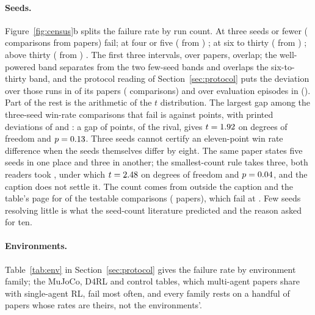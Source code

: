 \documentclass[sigconf,anonymous]{aamas}
\begin{document}
\paragraph{Seeds.} Figure~\ref{fig:census}b splits the failure rate by
run count. At three seeds or fewer (\nRunsLeThreeN{} comparisons from
\nRunsLeThreePapers{} papers) \nRunsLeThreeFailCi{} fail; at four or five
(\nRunsFourToFiveN{} from \nRunsFourToFivePapers{})
\nRunsFourToFiveFailCi{}; at six to thirty (\nRunsSixToThirtyN{} from
\nRunsSixToThirtyPapers{}) \nRunsSixToThirtyFailCi{}; above thirty
(\nRunsGtThirtyN{} from \nRunsGtThirtyPapers{}) \nRunsGtThirtyFailCi{}.
The first three intervals, over papers, overlap; the well-powered band
separates from the two few-seed bands and overlaps the six-to-thirty
band, and the protocol reading of
Section~\ref{sec:protocol} puts the deviation over those runs in
\nBignSdOverSeedsPapers{} of its \nBignPapers{} papers
(\nBignSdOverSeedsComparisons{} comparisons) and over evaluation episodes
in \nBignSdOverEpisodesPapers{} (\nBignSdOverEpisodesComparisons{}).
Part of the rest is the arithmetic of the $t$ distribution. The largest gap
among the \nExNThreeSeedFailing{} three-seed win-rate comparisons that fail
is \nExWinner{} against \nExRunner{} points, with printed deviations of
\nExWinnerSd{} and \nExRunnerSd{}: a gap of \nExGap{} points,
\nExRelativeGap{} of the rival, gives $t = 1.92{}$ on \nExDf{} degrees of
freedom and $p = 0.13{}$. Three seeds cannot certify an eleven-point win
rate difference when the seeds themselves differ by eight. The same paper
states five seeds in one place and three in another; the smallest-count
rule takes three, both readers took \nExReaderN{}, under which
$t = 2.48{}$ on \nExReaderDf{} degrees of freedom and
$p = 0.04{}$, and the caption does not settle it. The count comes
from outside the caption and the table's page for \nSpanRunsFromPaperN{}
of the \nANTestable{} testable comparisons (\nSpanRunsFromPaperPapers{}
papers), which fail at \nSpanRunsFromPaperFail{}. Few seeds resolving
little is what the seed-count literature predicted
\cite{colas2018how,agarwal2021deep} and the reason
\citet{gorsane2022towards} asked for ten.

\paragraph{Environments.} Table~\ref{tab:env} in Section~\ref{sec:protocol}
gives the failure rate by environment family; the MuJoCo, D4RL and
control tables, which multi-agent papers share with single-agent RL, fail
most often, and every family rests on a handful of papers whose rates are
theirs, not the environments'.
\end{document}
